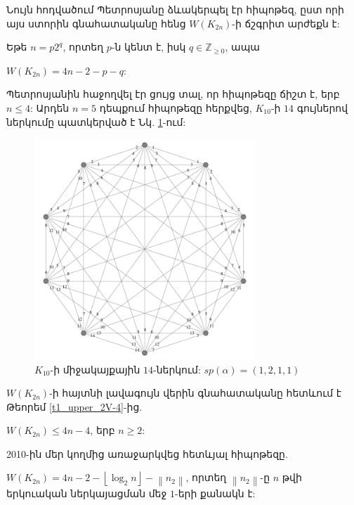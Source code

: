 Նույն հոդվածում Պետրոսյանը ձևակերպել էր հիպոթեզ, ըստ որի այս ստորին գնահատականը հենց $W(K_{2n})$-ի ճշգրիտ արժեքն է: 
\begin{hypothesis}
\label{h1_complete_pq}
Եթե $n=p2^{q}$, որտեղ $p$-ն կենտ է, իսկ $q \in \mathbb{Z}_{\geq 0}$, ապա
\begin{center}
$W\left(K_{2n}\right) = 4n-2-p-q$:
\end{center}
\end{hypothesis}

Պետրոսյանին հաջողվել էր ցույց տալ, որ հիպոթեզը ճիշտ է, երբ $n \leq 4$: Արդեն $n=5$ դեպքում հիպոթեզը հերքվեց, $K_{10}$-ի $14$ գույներով ներկումը պատկերված է Նկ. \ref{t2_K10}-ում:

\begin{figure}[b!]
\centering
\includegraphics[width=0.74\textwidth]{figures/K_10-14.pdf}
\caption{$K_{10}$-ի միջակայքային $14$-ներկում: $sp(\alpha) = (1,2,1,1)$}
\label{t2_K10}
\end{figure}

$W(K_{2n})$-ի հայտնի լավագույն վերին գնահատականը հետևում է Թեորեմ \ref{t1_upper_2V-4}-ից.
\begin{center}
$W(K_{2n}) \leq 4n-4$, երբ $n \geq 2$:
\end{center}

2010-ին մեր կողմից առաջարկվեց հետևյալ հիպոթեզը.
\begin{hypothesis}
\label{h1_complete_log}
$W(K_{2n}) = 4n-2-\left \lfloor \log_2{n} \right \rfloor - \left \| n_2 \right \|$, որտեղ $\left \| n_2 \right \|$-ը $n$ թվի երկուական ներկայացման մեջ $1$-երի քանակն է:
\end{hypothesis}

